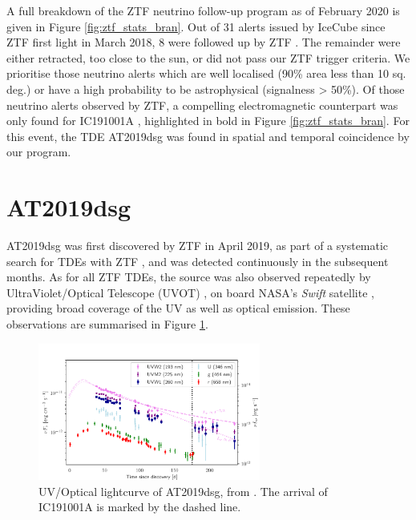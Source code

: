 \documentclass[a4paper,11pt]{article}
\begin{document}
A full breakdown of the ZTF neutrino follow-up program as of February 2020 is given in Figure \ref{fig:ztf_stats_bran}. Out of 31 alerts issued by IceCube since ZTF first light in March 2018, 8 were followed up by ZTF \cite{bran}. The remainder were either retracted, too close to the sun, or did not pass our ZTF trigger criteria. We prioritise those neutrino alerts which are well localised (90\% area less than 10 sq. deg.) or have a high probability to be astrophysical (signalness > 50\%). Of those neutrino alerts observed by ZTF, a compelling electromagnetic counterpart was only found for IC191001A \cite{bran}, highlighted in bold in Figure \ref{fig:ztf_stats_bran}. For this event, the TDE AT2019dsg was found in spatial and temporal coincidence by our program.

\section{AT2019dsg}

AT2019dsg was first discovered by ZTF in April 2019, as part of a systematic search for TDEs with ZTF \cite{van_velzen_20}, and was detected continuously in the subsequent months. As for all ZTF TDEs, the source was also observed repeatedly by UltraViolet/Optical Telescope (UVOT) \cite{swift_uvot_05}, on board NASA's \textit{Swift} satellite \cite{swift_04}, providing broad coverage of the UV as well as optical emission. These observations are summarised in Figure \ref{fig:bran_uv_opt}.

\begin{figure}[!ht]
	\centering
	\includegraphics[width=0.65\textwidth]{figures/uv_optical_lightcurve}
	\caption{UV/Optical lightcurve of AT2019dsg, from \cite{bran}. The arrival of IC191001A is marked by the dashed line.}
	\label{fig:bran_uv_opt}
\end{figure}
\end{document}
